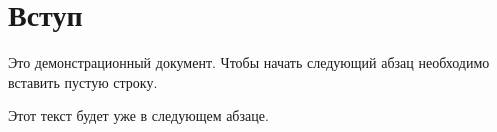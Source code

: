 \documentclass[ukrainian,utf8,floatsection,equationsection]{eskdtext}
\begin{document}
\maketitle %
\tableofcontents %
\newpage %
\section{Вступ} %
Это демонстрационный документ. Чтобы начать следующий абзац необходимо 
вставить пустую строку.

Этот текст будет уже в следующем абзаце.
\end{document}
